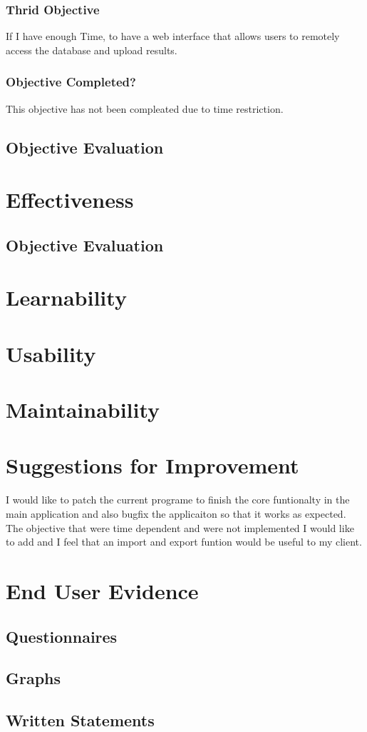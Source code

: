 \subsubsection{Thrid Objective}
If I have enough Time, to have a web interface that allows users to remotely access the database and upload results.
\subsubsection{Objective Completed?}
This objective has not been compleated due to time restriction.

\subsection{Objective Evaluation}

\section{Effectiveness}

\subsection{Objective Evaluation}

\section{Learnability}

\section{Usability}

\section{Maintainability}

\section{Suggestions for Improvement}
I would like to patch the current programe to finish the core funtionalty in the main application and also bugfix the applicaiton so that it works as expected. The objective that were time dependent and were not implemented I would like to add and I feel that an import and export funtion would be useful to my client.
\section{End User Evidence}

\subsection{Questionnaires}

\subsection{Graphs}

\subsection{Written Statements}
